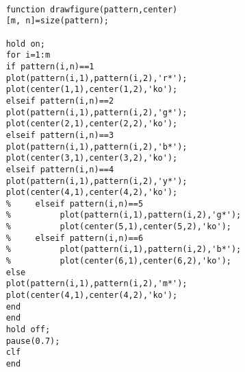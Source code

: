 \documentclass[withoutpreface,bwprint]{cumcmthesis} %
\begin{document}
\begin{appendices}
\begin{lstlisting}
	
	function drawfigure(pattern,center)
	[m, n]=size(pattern);
	
	hold on;
	for i=1:m
	if pattern(i,n)==1 
	plot(pattern(i,1),pattern(i,2),'r*');
	plot(center(1,1),center(1,2),'ko');
	elseif pattern(i,n)==2
	plot(pattern(i,1),pattern(i,2),'g*');
	plot(center(2,1),center(2,2),'ko');
	elseif pattern(i,n)==3
	plot(pattern(i,1),pattern(i,2),'b*');
	plot(center(3,1),center(3,2),'ko');
	elseif pattern(i,n)==4
	plot(pattern(i,1),pattern(i,2),'y*');
	plot(center(4,1),center(4,2),'ko');
	%     elseif pattern(i,n)==5
	%          plot(pattern(i,1),pattern(i,2),'g*');
	%          plot(center(5,1),center(5,2),'ko');
	%     elseif pattern(i,n)==6
	%          plot(pattern(i,1),pattern(i,2),'b*');
	%          plot(center(6,1),center(6,2),'ko');
	else
	plot(pattern(i,1),pattern(i,2),'m*');
	plot(center(4,1),center(4,2),'ko');
	end
	end
	hold off;
	pause(0.7);
	clf
	end
\end{lstlisting}

\end{appendices}
\end{document}
